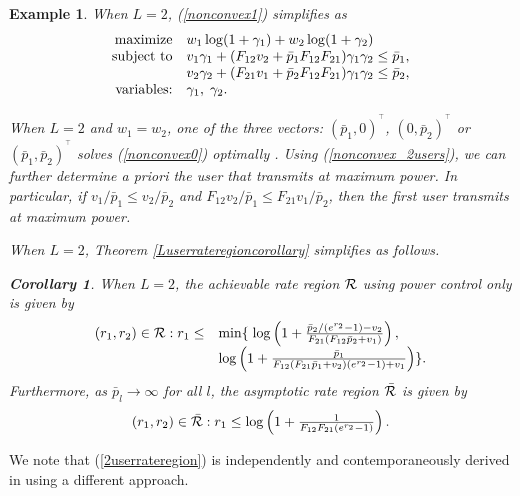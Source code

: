 \documentclass[10pt,twocolumn]{IEEEtran}
\newcommand{\0}{\mathbf{0}}
\newcommand{\1}{\mathbf{1}}
\newcommand{\trans}{^\top}
\newtheorem{corollary}{Corollary}
\newtheorem{example}{Example}
\begin{document}
\begin{example}
When $L=2$, (\ref{nonconvex1}) simplifies as
\begin{equation}
\label{nonconvex_2users}
\begin{array}
[c]{rl}
\mbox{maximize} & w_1 \log(1+\gamma_1)+w_2 \log(1+\gamma_2)\\
\mbox{subject to} &  v_1 \gamma_1 + (F_{12}v_2 + \bar{p}_1 F_{12}F_{21} ) \gamma_1 \gamma_2 \le \bar{p}_1, \\
&  v_2 \gamma_2 + (F_{21}v_1 + \bar{p}_2 F_{12}F_{21} ) \gamma_1 \gamma_2 \le \bar{p}_2, \\
\mbox{variables:} & \gamma_1, \; \gamma_2 .
\end{array}
\end{equation}

When $L=2$ and $w_1=w_2$, one of the three vectors: $(\bar{p}_1,0)^{\trans}$, $(0,\bar{p}_2)^{\trans}$ or $(\bar{p}_1,\bar{p}_2)^{\trans}$ solves (\ref{nonconvex0}) optimally \cite{Ebrahimi06,Gesbert07}. Using (\ref{nonconvex_2users}), we can further determine a priori the user that transmits at maximum power. In particular, if $v_1/\bar{p}_1 \le v_2/\bar{p}_2$ and $F_{12}v_2/\bar{p}_1 \le F_{21}v_1/\bar{p}_2$, then the first user transmits at maximum power. 

When $L=2$, Theorem \ref{Luserrateregioncorollary} simplifies as follows.
\begin{corollary}
\label{rateregion}
When $L=2$, the achievable rate region $\cal{R}$ using power control only is given by
\begin{equation}
\label{2userrateregion}
\begin{array}[c]{rl}
(r_1,r_2) \in \mbox{$\cal{R}$} : 
r_1 \le & \min \{ \; \log\left( 1+\frac{\bar{p}_2/(e^{r_2}-1)-v_2}{F_{21}(F_{12}\bar{p}_2+v_1)} \right) , \; \\
& \log\left( 1+\frac{\bar{p}_1}{F_{12}(F_{21}\bar{p}_1+v_2)(e^{r_2}-1)+v_1} \right) \}.
\end{array}
\end{equation}
Furthermore, as $\bar{p}_l \rightarrow \infty$ for all $l$, the asymptotic rate region $\cal{\bar{R}}$ is given by 
\begin{equation}
\label{rateregionupperbound}
(r_1,r_2) \in \cal{\bar{R}} : 
\mbox{$r_1 \le  \log\left( 1+\frac{1}{F_{12}F_{21}(e^{r_2}-1)} \right).
$}
\end{equation}
\end{corollary}
\end{example}
We note that (\ref{2userrateregion}) is independently and contemporaneously derived in \cite{Charafeddine07} using a different approach.
\end{document}

